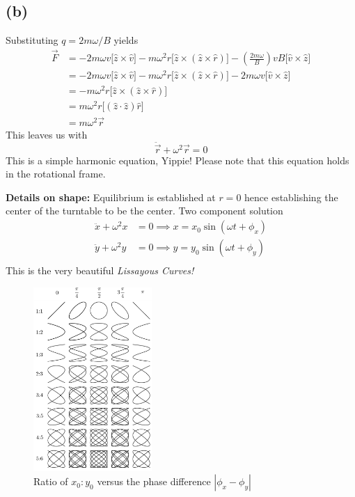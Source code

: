 \documentclass[letter, 10pts]{article}
\begin{document}
\subsection*{(b)} 
Substituting $q = 2 m \omega / B$ yields 
\begin{align*}
	\vec{F} &= - 2m \omega v 
\Biggr[ 
\hat{z} \times \hat{v}
\Biggr]
- m \omega^2 r \Biggr[ \hat{z} \times (\hat{z} \times \hat{r} ) \Biggr]- 
\left(
\frac{2 m \omega}{B}
\right)v B \Biggr[\hat{v} \times \hat{z}\Biggr] \\
	&= - 2m \omega v 
\Biggr[ 
\hat{z} \times \hat{v}
\Biggr]
- m \omega^2 r \Biggr[ \hat{z} \times (\hat{z} \times \hat{r} ) \Biggr]- 
2 m \omega v  \Biggr[\hat{v} \times \hat{z}\Biggr] \\
	&= 
- m \omega^2 r \Biggr[ \hat{z} \times (\hat{z} \times \hat{r} ) \Biggr] \\ &=
 m \omega^2 r \Biggr[ (\hat{z}\cdot \hat{z} ) \hat{r} \Biggr]
									\\ &= 
								 m \omega^2 \vec{r}
\end{align*}
This leaves us with 
\[
\ddot{\vec{r}} + \omega^2 \vec{r} = 0
\] 
This is a simple harmonic equation, Yippie! Please note that this equation holds in the rotational frame. 




\textbf{Details on shape: } Equilibrium is established at $r = 0$ hence establishing the center of the turntable to be the center. Two component solution 
\begin{align*}
	\ddot{x} + \omega^2 x &= 0  \implies x = x_0 \sin(\omega t + \phi_x)\\ 
	\ddot{y} + \omega^2 y &= 0 \implies y = y_0 \sin(\omega t + \phi_y)\\ 
\end{align*}
This is the very beautiful \emph{Lissayous Curves!}

\begin{figure}[H]
	\centering
	\includegraphics[width=0.4\textwidth]{./ss/9/1.png}
	\caption{Ratio of $x_0:y_0$ versus the phase difference $|\phi_x - \phi_y|$}
	\label{fig:-ss-9-1-png}
\end{figure}
\end{document}
